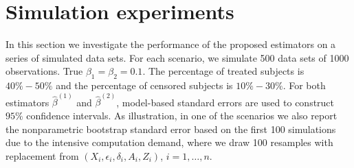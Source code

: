 \documentclass[11pt]{article}
\newcommand{\eqnn}{\begin{eqnarray*}}
\newcommand{\een}{\end{eqnarray*}}
\begin{document}










\section{Simulation experiments}\label{simulation}


In this section we investigate the performance of the proposed estimators on a series of simulated data sets.
For each scenario, we simulate 500 data sets of 1000 observations.
True $\beta_1= \beta_2 =0.1$. 
 The percentage of treated subjects is $40\%-50\%$ and the percentage of censored subjects is $10\%-30\%$.
For both estimators $\hat \beta^{(1)}$ and $\hat \beta^{(2)}$, model-based standard errors 
are used to construct $95\%$ confidence intervals. 
As illustration, in one of the scenarios 
we also report the nonparametric  bootstrap  standard error based on the first 100 simulations due to the intensive computation demand, 
where we draw 100 resamples with replacement from $(X_i, \epsilon_i, \delta_i,A_i,Z_i)$, $i=1,\ldots,n$. 
\end{document}
